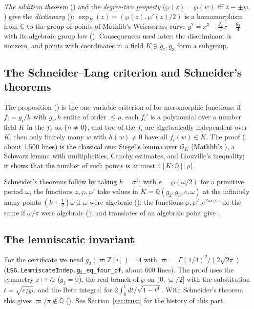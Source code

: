 \documentclass[11pt]{amsart}
\theoremstyle{definition}
\theoremstyle{remark}
\numberwithin{equation}{section}
\newcommand{\ZZ}{\mathbb{Z}}
\newcommand{\QQ}{\mathbb{Q}}
\newcommand{\CC}{\mathbb{C}}
\newcommand{\Qbar}{\overline{\mathbb{Q}}}
\newcommand{\vp}{\varpi}
\begin{document}
\emph{The addition theorem} () and the \emph{degree-two property}
($\wp(z)=\wp(w)$ iff $z\equiv\pm w$, ) give the \emph{dictionary}
(): $\exp_E(z)=(\wp(z),\wp'(z)/2)$ is a homomorphism from $\CC$ to
the group of points of Mathlib's Weierstrass curve $y^2=x^3-\frac{g_2}4x-\frac{g_3}4$ with its
algebraic group law (). Consequences used later: the discriminant is nonzero, and
points with coordinates in a field $K\ni g_2,g_3$ form a subgroup.

\subsection{The Schneider--Lang criterion and Schneider's theorems}
The proposition  () is the one-variable criterion of
\cite[Ch.~III, Thm.~1]{Lang1966} for meromorphic functions: if $f_i=g_i/h$ with $g_i,h$ entire of order
$\le\rho$, each $f_i'$ is a polynomial over a number field $K$ in the $f_j$ on $\{h\ne0\}$, and two of the
$f_i$ are algebraically independent over $K$, then only finitely many $w$ with $h(w)\ne0$ have all
$f_i(w)\in K$. The proof  (, about 1{,}500 lines)
is the classical one: Siegel's lemma over $\mathcal O_K$ (Mathlib's
), a Schwarz lemma with multiplicities, Cauchy
estimates, and Liouville's inequality; it shows that the number of such points is at most
$4[K:\QQ]\lceil\rho\rceil$.

Schneider's theorems follow by taking $h=\sigma^3$: with $e=\wp(\omega/2)$ for a primitive period
$\omega$, the functions $z,\wp,\wp'$ take values in $K=\QQ(g_2,g_3,e,\omega)$ at the infinitely many points
$(k+\frac12)\omega$ if $\omega$ were algebraic (); the functions
$\wp,\wp',e^{2\pi iz/\omega}$ do the same if $\omega/\pi$ were algebraic
(); and translates of an algebraic point give
.

\subsection{The lemniscatic invariant}
For the certificate we need $g_2(\vp\ZZ[i])=4$ with $\vp=\Gamma(1/4)^2/(2\sqrt{2\pi})$
(\texttt{LSG.LemniscateIndep.g}$_2$\texttt{\_eq\_four\_of}, about 600 lines). The proof uses the symmetry $z\mapsto iz$
($g_3=0$), the real branch of $\wp$ on $(0,\vp/2]$ with the substitution $t=\sqrt{e/\wp}$, and the
Beta integral for $2\int_0^1dt/\sqrt{1-t^4}$. With Schneider's theorem this gives
$\vp/\pi\notin\Qbar$ (). See Section~\ref{sec:trust} for
the history of this part.
\end{document}
